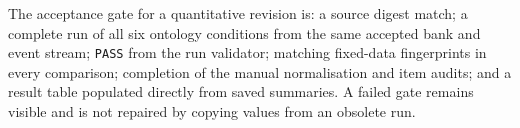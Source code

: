 

The acceptance gate for a quantitative revision is: a source digest match; a
complete run of all six ontology conditions from the same accepted bank and
event stream; \texttt{PASS} from the run validator; matching fixed-data
fingerprints in every comparison; completion of the manual normalisation and
item audits; and a result table populated directly from saved summaries.  A
failed gate remains visible and is not repaired by copying values from an
obsolete run.
